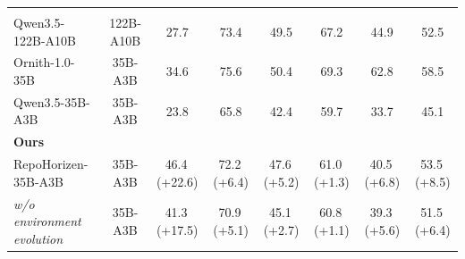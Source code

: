 \documentclass{article}
\begin{document}
{\begin{tabular}{l*{7}{c}}
        \midrule

        \rowcolor{black!5}
        \multicolumn{8}{l}{\strut\textbf{Open-Weight Models ($<$200B)}} \\

        Qwen3.5-122B-A10B & 122B-A10B & 27.7 & 73.4 & 49.5 & 67.2 & 44.9 & 52.5 \\
        Ornith-1.0-35B & 35B-A3B & 34.6 & 75.6 & 50.4 & 69.3 & 62.8 & 58.5 \\

        Qwen3.5-35B-A3B
        & 35B-A3B
        & 23.8
        & 65.8
        & 42.4
        & 59.7
        & 33.7
        & 45.1 \\

        \midrule

        \rowcolor[HTML]{DFE7F5}
        \textbf{Ours} & & & & & & & \\

        RepoHorizen-35B-A3B
        & 35B-A3B
        & 46.4\,\textcolor{green!50!black}{(+22.6)}
        & 72.2\,\textcolor{green!50!black}{(+6.4)}
        & 47.6\,\textcolor{green!50!black}{(+5.2)}
        & 61.0\,\textcolor{green!50!black}{(+1.3)}
        & 40.5\,\textcolor{green!50!black}{(+6.8)}
        & 53.5\,\textcolor{green!50!black}{(+8.5)} \\

        \quad \textit{w/o environment evolution}
        & 35B-A3B
        & 41.3\,\textcolor{green!50!black}{(+17.5)}
        & 70.9\,\textcolor{green!50!black}{(+5.1)}
        & 45.1\,\textcolor{green!50!black}{(+2.7)}
        & 60.8\,\textcolor{green!50!black}{(+1.1)}
        & 39.3\,\textcolor{green!50!black}{(+5.6)}
        & 51.5\,\textcolor{green!50!black}{(+6.4)} \\

        \bottomrule
    \end{tabular}
}
\end{document}
